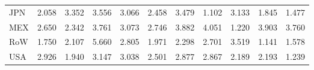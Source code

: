 \begin{table}[htbp]
\begin{tabular}{lcccccccccc}
  JPN & \textcolor[RGB]{204,132,51}{2.058} & \textcolor[RGB]{97,63,158}{3.352} & \textcolor[RGB]{84,54,171}{3.556} & \textcolor[RGB]{115,74,140}{3.066} & \textcolor[RGB]{173,112,82}{2.458} & \textcolor[RGB]{92,59,163}{3.479} & \textcolor[RGB]{250,162,5}{1.102} & \textcolor[RGB]{110,71,145}{3.133} & \textcolor[RGB]{219,142,36}{1.845} & \textcolor[RGB]{227,147,28}{1.477} \\ 
  MEX & \textcolor[RGB]{158,102,97}{2.650} & \textcolor[RGB]{184,119,71}{2.342} & \textcolor[RGB]{74,48,181}{3.761} & \textcolor[RGB]{112,73,143}{3.073} & \textcolor[RGB]{148,96,107}{2.746} & \textcolor[RGB]{64,41,191}{3.882} & \textcolor[RGB]{56,36,199}{4.051} & \textcolor[RGB]{240,155,15}{1.220} & \textcolor[RGB]{61,40,194}{3.903} & \textcolor[RGB]{77,50,178}{3.760} \\ 
  RoW & \textcolor[RGB]{222,144,33}{1.750} & \textcolor[RGB]{201,130,54}{2.107} & \textcolor[RGB]{25,16,230}{5.660} & \textcolor[RGB]{143,92,112}{2.805} & \textcolor[RGB]{207,134,48}{1.971} & \textcolor[RGB]{189,122,66}{2.298} & \textcolor[RGB]{153,99,102}{2.701} & \textcolor[RGB]{89,58,166}{3.519} & \textcolor[RGB]{247,160,8}{1.141} & \textcolor[RGB]{224,145,31}{1.578} \\ 
  USA & \textcolor[RGB]{130,84,125}{2.926} & \textcolor[RGB]{214,139,41}{1.940} & \textcolor[RGB]{107,69,148}{3.147} & \textcolor[RGB]{117,76,138}{3.038} & \textcolor[RGB]{168,109,87}{2.501} & \textcolor[RGB]{138,89,117}{2.877} & \textcolor[RGB]{140,91,115}{2.867} & \textcolor[RGB]{196,127,59}{2.189} & \textcolor[RGB]{194,125,61}{2.193} & \textcolor[RGB]{235,152,20}{1.239} \\ 
   \hline
\end{tabular}
\end{table}
